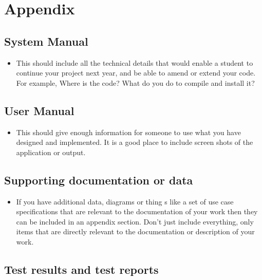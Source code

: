 \section{Appendix}
\label{sec:appendix}


\subsection{System Manual}

\begin{framed}
	\begin{itemize}
		\item This should include all the technical details that would enable a student to continue your project next year, and be able to amend or extend your code. For example, Where is the code? What do you do to compile and install it?
	\end{itemize}
\end{framed}

\subsection{User Manual}

\begin{framed}
	\begin{itemize}
		\item This should give enough information for someone to use what you have designed and implemented. It is a good place to include screen shots of the application or output.
	\end{itemize}
\end{framed}

\subsection{Supporting documentation or data}

\begin{framed}
	\begin{itemize}
		\item If you have additional data, diagrams or thing s like a set of use case specifications that are relevant to the documentation of your work then they can be included in an appendix section. Don't just include everything, only items that are directly relevant to the documentation or description of your work.
	\end{itemize}
\end{framed}

\subsection{Test results and test reports}

